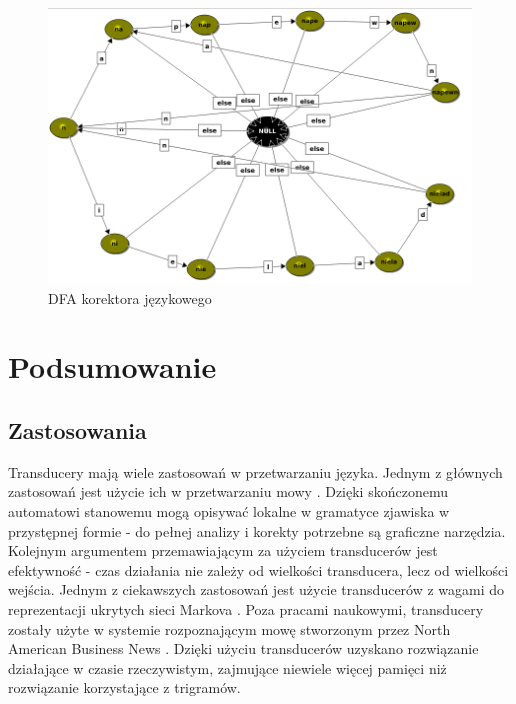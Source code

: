 \documentclass[declaration,shortabstract]{iithesis}
\theoremstyle{definition}
\theoremstyle{plain}
\begin{document}
\begin{figure}
\centering
\includegraphics[width=\textwidth,height=\textheight,keepaspectratio]{correctorFSM.png}
\caption{DFA korektora językowego}
\label{fig:abc}
\end{figure}
\chapter{Podsumowanie}
\section{Zastosowania}
Transducery mają wiele zastosowań w przetwarzaniu języka. Jednym z głównych zastosowań jest użycie ich w przetwarzaniu mowy \cite{Zastosowanie 2}. Dzięki skończonemu automatowi stanowemu mogą opisywać lokalne w gramatyce zjawiska w przystępnej formie - do pełnej analizy i korekty potrzebne są graficzne narzędzia. Kolejnym argumentem przemawiającym za użyciem transducerów jest efektywność - czas działania nie zależy od wielkości transducera, lecz od wielkości wejścia.  Jednym z ciekawszych zastosowań jest użycie transducerów z wagami do reprezentacji ukrytych sieci Markova \cite{Zastosowanie 1}. Poza pracami naukowymi, transducery zostały użyte w systemie rozpoznającym mowę stworzonym przez North American Business News \cite{Zastosowanie 1}. Dzięki użyciu transducerów uzyskano rozwiązanie działające w czasie rzeczywistym, zajmujące niewiele więcej pamięci niż rozwiązanie korzystające z trigramów.
\end{document}
